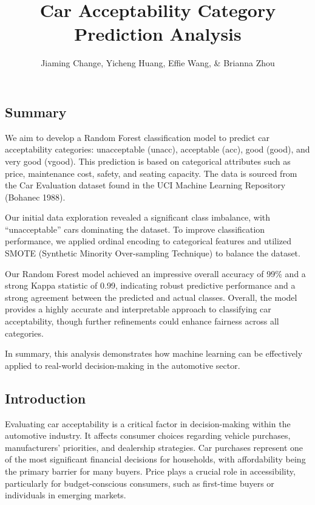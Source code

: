 \documentclass[
  letterpaper,
  DIV=11,
  numbers=noendperiod]{scrartcl}
\title{Car Acceptability Category Prediction Analysis}
\author{Jiaming Change, Yicheng Huang, Effie Wang, \& Brianna Zhou}
\date{}
\renewcommand*\contentsname{Table of contents}
\newcommand\contentsname{Table of contents}
\begin{document}
\maketitle

\renewcommand*\contentsname{Table of contents}
{
\hypersetup{linkcolor=}
\setcounter{tocdepth}{3}
\tableofcontents
}

\subsection{Summary}\label{summary}

We aim to develop a Random Forest classification model to predict car
acceptability categories: unacceptable (unacc), acceptable (acc), good
(good), and very good (vgood). This prediction is based on categorical
attributes such as price, maintenance cost, safety, and seating
capacity. The data is sourced from the Car Evaluation dataset found in
the UCI Machine Learning Repository (Bohanec 1988).

Our initial data exploration revealed a significant class imbalance,
with ``unacceptable'' cars dominating the dataset. To improve
classification performance, we applied ordinal encoding to categorical
features and utilized SMOTE (Synthetic Minority Over-sampling Technique)
to balance the dataset.

Our Random Forest model achieved an impressive overall accuracy of 99\%
and a strong Kappa statistic of 0.99, indicating robust predictive
performance and a strong agreement between the predicted and actual
classes. Overall, the model provides a highly accurate and interpretable
approach to classifying car acceptability, though further refinements
could enhance fairness across all categories.

In summary, this analysis demonstrates how machine learning can be
effectively applied to real-world decision-making in the automotive
sector.

\subsection{Introduction}\label{introduction}

Evaluating car acceptability is a critical factor in decision-making
within the automotive industry. It affects consumer choices regarding
vehicle purchases, manufacturers' priorities, and dealership strategies.
Car purchases represent one of the most significant financial decisions
for households, with affordability being the primary barrier for many
buyers. Price plays a crucial role in accessibility, particularly for
budget-conscious consumers, such as first-time buyers or individuals in
emerging markets.
\end{document}
